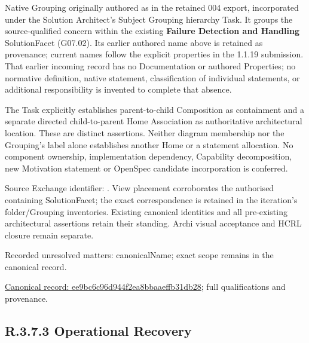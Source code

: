 Native Grouping originally authored as \texttt{} in the retained 004 export,
incorporated under the Solution Architect's Subject Grouping hierarchy Task.
It groups the source-qualified \texttt{} concern within
the existing \textbf{Failure Detection and Handling} SolutionFacet (G07.02). Its earlier authored name above is retained as provenance; current names
follow the explicit properties in the 1.1.19 submission.
That earlier incoming record has no Documentation or authored Properties; no normative
definition, native statement, classification of individual statements, or
additional responsibility is invented to complete that absence.



The Task explicitly establishes parent-to-child Composition as containment and
a separate directed child-to-parent Home Association as authoritative architectural
location. These are distinct assertions. Neither diagram membership nor the
Grouping's label alone establishes another Home or a statement allocation.
No component ownership, implementation dependency, Capability decomposition,
new Motivation statement or OpenSpec candidate incorporation is conferred.



Source Exchange identifier: \texttt{}. View placement corroborates
the authorised containing SolutionFacet; the exact correspondence is retained in the
iteration's folder/Grouping inventories. Existing canonical identities and all
pre-existing architectural assertions retain their standing. Archi visual
acceptance and HCRL closure remain separate.


{\small Recorded unresolved matters: canonicalName; exact scope remains in the canonical record.}\par
{\footnotesize \href{../../../../../../../continuum/grouping/ee9bc6c96d944f2ea8bbaaeffb31db28.md}{Canonical record: ee9bc6c96d944f2ea8bbaaeffb31db28}; full qualifications and provenance.}\par
\subsection*{R.3.7.3 Operational Recovery}
\label{navigation:R.3.7.3}

